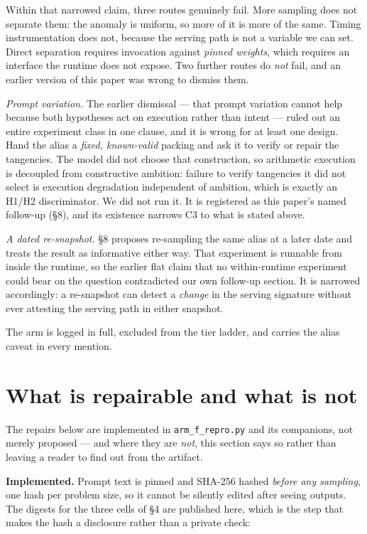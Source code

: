 \documentclass[11pt]{article}
\begin{document}
Within that narrowed claim, three routes genuinely fail. More sampling does not separate
them: the anomaly is uniform, so more of it is more of the same. Timing instrumentation
does not, because the serving path is not a variable we can set. Direct separation
requires invocation against \emph{pinned weights}, which requires an interface the runtime
does not expose. Two further routes do \emph{not} fail, and an earlier version of this paper
was wrong to dismiss them.

\emph{Prompt variation.} The earlier dismissal --- that prompt variation cannot help because
both hypotheses act on execution rather than intent --- ruled out an entire experiment class
in one clause, and it is wrong for at least one design. Hand the alias a \emph{fixed,
known-valid} packing and ask it to verify or repair the tangencies. The model did not
choose that construction, so arithmetic execution is decoupled from constructive ambition:
failure to verify tangencies it did not select is execution degradation independent of
ambition, which is exactly an H1/H2 discriminator. We did not run it. It is registered as
this paper's named follow-up (\S8), and its existence narrows C3 to what is stated above.

\emph{A dated re-snapshot.} \S8 proposes re-sampling the same alias at a later date and treats
the result as informative either way. That experiment is runnable from inside the runtime,
so the earlier flat claim that no within-runtime experiment could bear on the question
contradicted our own follow-up section. It is narrowed accordingly: a re-snapshot can
detect a \emph{change} in the serving signature without ever attesting the serving path in
either snapshot.

The arm is logged in full, excluded from the tier ladder, and carries the alias caveat in
every mention.

\section{What is repairable and what is not}

The repairs below are implemented in \texttt{arm\_f\_repro.py} and its companions, not merely
proposed --- and where they are \emph{not}, this section says so rather than leaving a reader to
find out from the artifact.

\textbf{Implemented.} Prompt text is pinned and SHA-256 hashed \emph{before any sampling}, one hash
per problem size, so it cannot be silently edited after seeing outputs. The digests for
the three cells of \S4 are published here, which is the step that makes the hash a
disclosure rather than a private check:
\end{document}
